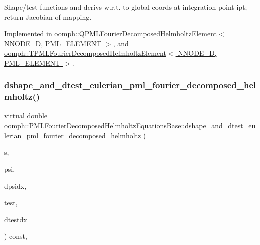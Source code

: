 Shape/test functions and derivs w.\+r.\+t. to global coords at integration point ipt; return Jacobian of mapping. 



Implemented in \hyperlink{classoomph_1_1QPMLFourierDecomposedHelmholtzElement_a40b27cbfd852c4b678596070d1dd2d8b}{oomph\+::\+Q\+P\+M\+L\+Fourier\+Decomposed\+Helmholtz\+Element$<$ N\+N\+O\+D\+E\+\_\+D, P\+M\+L\+\_\+\+E\+L\+E\+M\+E\+N\+T $>$}, and \hyperlink{classoomph_1_1TPMLFourierDecomposedHelmholtzElement_a745a27ed6efc2d33114b7f380b132a27}{oomph\+::\+T\+P\+M\+L\+Fourier\+Decomposed\+Helmholtz\+Element$<$ N\+N\+O\+D\+E\+\_\+D, P\+M\+L\+\_\+\+E\+L\+E\+M\+E\+N\+T $>$}.

\mbox{\label{classoomph_1_1PMLFourierDecomposedHelmholtzEquationsBase_ac00e3f75197b37ff99a343b88b36284f}} 
\subsubsection{\texorpdfstring{dshape\+\_\+and\+\_\+dtest\+\_\+eulerian\+\_\+pml\+\_\+fourier\+\_\+decomposed\+\_\+helmholtz()}{dshape\_and\_dtest\_eulerian\_pml\_fourier\_decomposed\_helmholtz()}}
{\footnotesize\ttfamily virtual double oomph\+::\+P\+M\+L\+Fourier\+Decomposed\+Helmholtz\+Equations\+Base\+::dshape\+\_\+and\+\_\+dtest\+\_\+eulerian\+\_\+pml\+\_\+fourier\+\_\+decomposed\+\_\+helmholtz (\begin{DoxyParamCaption}\item[{const \hyperlink{classoomph_1_1Vector}{Vector}$<$ double $>$ \&}]{s,  }\item[{\hyperlink{classoomph_1_1Shape}{Shape} \&}]{psi,  }\item[{\hyperlink{classoomph_1_1DShape}{D\+Shape} \&}]{dpsidx,  }\item[{\hyperlink{classoomph_1_1Shape}{Shape} \&}]{test,  }\item[{\hyperlink{classoomph_1_1DShape}{D\+Shape} \&}]{dtestdx }\end{DoxyParamCaption}) const\hspace{0.3cm}{\ttfamily [protected]}, {}}



